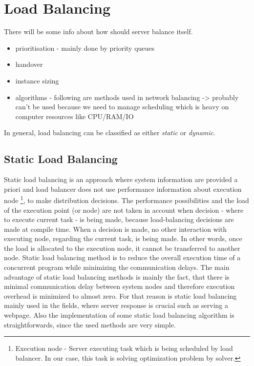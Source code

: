 
\newpage
\section{Load Balancing}\label{sec:load-balancing}
There will be some info about how should server balance itself.
\begin{itemize}
    \item prioritisation - mainly done by priority queues
    \item handover
    \item instance sizing
    \item algorithms - following are methods used in network balancing -> probably can't be used because we need to manage scheduling
    which is heavy on computer resources like CPU/RAM/IO
\end{itemize}

In general, load balancing can be classified as either \textit{static} or \textit{dynamic}.

\subsection{Static Load Balancing}\label{subsec:static-load-balancing}
Static load balancing is an approach where system information are provided a priori
and load balancer does not use performance information about execution node
\footnote{Execution node - Server executing task which is being scheduled by load balancer.
In our case, this task is solving optimization problem by solver.},
to make distribution decisions.
The performance possibilities and the load of the execution point (or node) are not taken in account
when decision - where to execute current task - is being made, because load-balancing decisions are made at compile time.
When a decision is made, no other interaction with executing node, regarding the current task, is being made.
In other words, once the load is allocated to the execution node, it cannot be transferred to another node.
Static load balancing method is to reduce the overall execution time of a concurrent program while minimizing the communication delays\cite{web:loadBalancingInGridComputing}.
The main advantage of static load balancing methods is mainly the fact, that there is minimal communication delay between system nodes
and therefore execution overhead is minimized to almost zero.
For that reason is static load balancing mainly used in the fields, where server response is crucial such as serving a webpage.
Also the implementation of some static load balancing algorithm is straightforwards, since the used methods are very simple.

